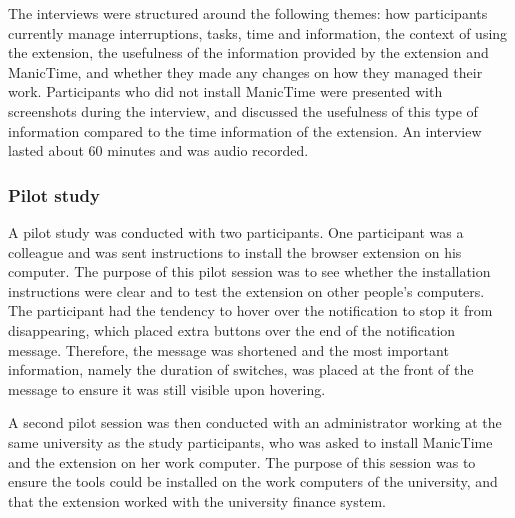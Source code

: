 The interviews were structured around the following themes: how participants currently manage interruptions, tasks, time and information, the context of using the extension, the usefulness of the information provided by the extension and ManicTime, and whether they made any changes on how they managed their work. Participants who did not install ManicTime were presented with screenshots during the interview, and discussed the usefulness of this type of information compared to the time information of the extension. An interview lasted about 60 minutes and was audio recorded. 

\subsubsection{Pilot study}
A pilot study was conducted with two participants. One participant was a colleague and was sent instructions to install the browser extension on his computer. The purpose of this pilot session was to see whether the installation instructions were clear and to test the extension on other people's computers. The participant had the tendency to hover over the notification to stop it from disappearing, which placed extra buttons over the end of the notification message. Therefore, the message was shortened and the most important information, namely the duration of switches, was placed at the front of the message to ensure it was still visible upon hovering.

A second pilot session was then conducted with an administrator working at the same university as the study participants, who was asked to install ManicTime and the extension on her work computer. The purpose of this session was to ensure the tools could be installed on the work computers of the university, and that the extension worked with the university finance system.

